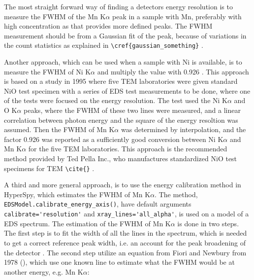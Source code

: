 


The most straight forward way of finding a detectors energy resolution is to measure the FWHM of the Mn K$\alpha$ peak in a sample with Mn, preferably with high concentration as that provides more defined peaks.
The FWHM measurement should be from a Gaussian fit of the peak, because of variations in the count statistics as explained in \verb|\cref{gaussian_something}| .


Another approach, which can be used when a sample with Ni is available, is to measure the FWHM of Ni K$\alpha$ and multiply the value with 0.926 \cite{bennett_egerton_1995}.
This approach is based on a study in 1995 where five TEM laboratories were given  standard NiO test specimen with a series of EDS test measurements to be done, where one of the tests were focused on the energy resolution.
The test used the Ni K$\alpha$ and O K$\alpha$ peaks, where the FWHM of these two lines were measured, and a linear correlation between photon energy and the square of the energy resoltion was assumed.
Then the FWHM of Mn K$\alpha$ was determined by interpolation, and the factor 0.926 was reported as a sufficiently good conversion between Ni K$\alpha$ and Mn K$\alpha$ for the five TEM laboratories.
This approach is the recommended method provided by Ted Pella Inc., who manufactures standardized NiO test specimens for TEM \verb|\cite{}| .


A third and more general approach, is to use the energy calibration method in HyperSpy, which estimates the FWHM of Mn K$\alpha$.
The method, \verb|EDSModel.calibrate_energy_axis()|, have default arguments \verb|calibrate='resolution'| and \verb|xray_lines='all_alpha'|, is used on a model of a EDS spectrum.
The estimation of the FWHM of Mn K$\alpha$ is done in two steps.
The first step is to fit the width of all the lines in the spectrum, which is needed to get a correct reference peak width, i.e. an account for the peak broadening of the detector .
The second step utilize an equation from Fiori and Newbury from 1978 (), which use one known line to estimate what the FWHM would be at another energy, e.g. Mn K$\alpha$:

